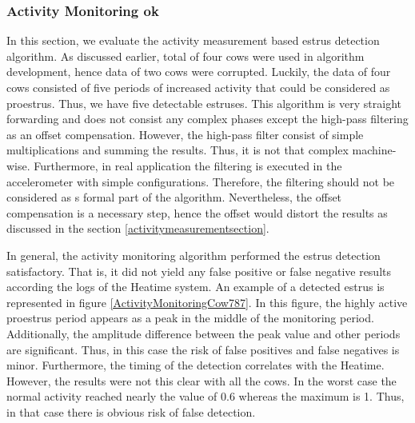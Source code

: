 \documentclass[english,12pt,a4paper,pdftex,elec,utf8]{aaltothesis}
\begin{document}
\subsubsection{Activity Monitoring ok} \label{activitymeasurementevaluation}

In this section, we evaluate the activity measurement based estrus detection algorithm. As discussed earlier, total of four cows were used in algorithm development, hence data of two cows were corrupted.  Luckily, the data of four cows consisted of five periods of increased activity that could be considered as proestrus. Thus, we have five detectable estruses. This algorithm is very straight forwarding and does not consist any complex phases except the high-pass filtering as an offset compensation. However, the high-pass filter consist of simple multiplications and summing the results. Thus, it is not that complex machine-wise. Furthermore, in real application the filtering is executed in the accelerometer with simple configurations. Therefore, the filtering should not be considered as s formal part of the algorithm. Nevertheless, the offset compensation is a necessary step, hence the offset would distort the results as discussed in the section \ref{activitymeasurementsection}.

In general, the activity monitoring algorithm performed the estrus detection satisfactory. That is, it did not yield any false positive or false negative results according the logs of the Heatime system. An example of a detected estrus is represented in figure \ref{ActivityMonitoringCow787}. In this figure, the highly active proestrus period appears as a peak in the middle of the monitoring period. Additionally, the amplitude difference between the peak value and other periods are significant. Thus, in this case the risk of false positives and false negatives is minor. Furthermore, the timing of the detection correlates with the Heatime. However, the results were not this clear with all the cows. In the worst case the normal activity reached nearly the value of 0.6 whereas the maximum is 1. Thus, in that case there is obvious risk of false detection. 
\end{document}
